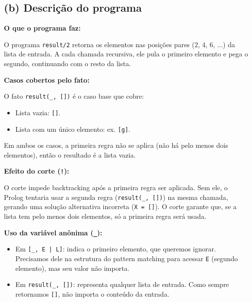 \documentclass{article}
\begin{document}
\subsection*{(b) Descrição do programa}

\textbf{O que o programa faz:}

O programa \texttt{result/2} retorna os elementos nas posições pares (2, 4, 6, ...) da lista de entrada. A cada chamada recursiva, ele pula o primeiro elemento e pega o segundo, continuando com o resto da lista.

\textbf{Casos cobertos pelo fato:}

O fato \texttt{result(\_, [])} é o caso base que cobre:
\begin{itemize}
    \item Lista vazia: \texttt{[]}.
    \item Lista com um único elemento: ex. \texttt{[g]}.
\end{itemize}
Em ambos os casos, a primeira regra não se aplica (não há pelo menos dois elementos), então o resultado é a lista vazia.

\textbf{Efeito do corte (\texttt{!}):}

O corte impede backtracking após a primeira regra ser aplicada. Sem ele, o Prolog tentaria usar a segunda regra (\texttt{result(\_, [])}) na mesma chamada, gerando uma solução alternativa incorreta (\texttt{X = []}). O corte garante que, se a lista tem pelo menos dois elementos, só a primeira regra será usada.

\textbf{Uso da variável anônima (\texttt{\_}):}

\begin{itemize}
    \item Em \texttt{[\_, E | L]}: indica o primeiro elemento, que queremos ignorar. Precisamos dele na estrutura do pattern matching para acessar \texttt{E} (segundo elemento), mas seu valor não importa.
    \item Em \texttt{result(\_, [])}: representa qualquer lista de entrada. Como sempre retornamos \texttt{[]}, não importa o conteúdo da entrada.
\end{itemize}
\end{document}
